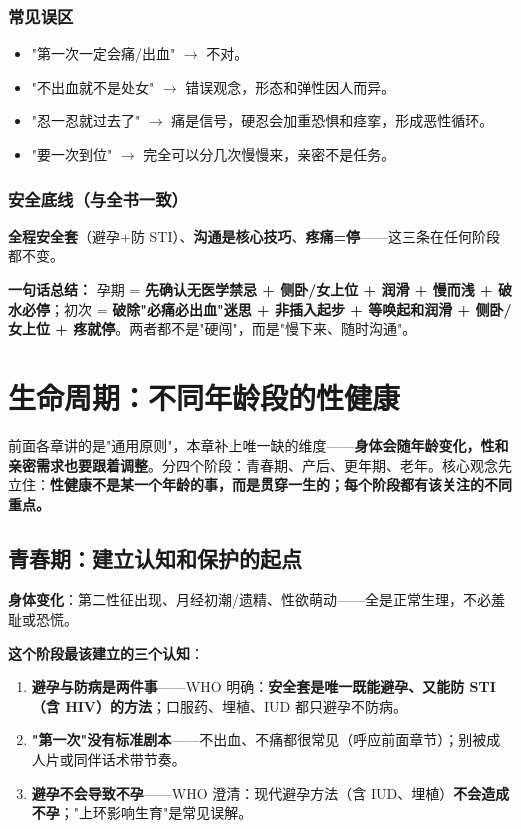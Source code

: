 \documentclass[12pt,UTF8,openany]{ctexbook}
\begin{document}
\subsection{常见误区}

\begin{itemize}[leftmargin=2em,itemsep=0.3em]
  \item "第一次一定会痛/出血" $\rightarrow$ 不对。
  \item "不出血就不是处女" $\rightarrow$ 错误观念，形态和弹性因人而异。
  \item "忍一忍就过去了" $\rightarrow$ 痛是信号，硬忍会加重恐惧和痉挛，形成恶性循环。
  \item "要一次到位" $\rightarrow$ 完全可以分几次慢慢来，亲密不是任务。
\end{itemize}

\subsection{安全底线（与全书一致）}

\textbf{全程安全套}（避孕+防 STI）、\textbf{沟通是核心技巧}、\textbf{疼痛=停}——这三条在任何阶段都不变。

\vspace{1em}
\noindent\textbf{一句话总结：} 孕期 = \textbf{先确认无医学禁忌 + 侧卧/女上位 + 润滑 + 慢而浅 + 破水必停}；初次 = \textbf{破除"必痛必出血"迷思 + 非插入起步 + 等唤起和润滑 + 侧卧/女上位 + 疼就停}。两者都不是"硬闯"，而是"慢下来、随时沟通"。

\chapter{生命周期：不同年龄段的性健康}

前面各章讲的是"通用原则"，本章补上唯一缺的维度——\textbf{身体会随年龄变化，性和亲密需求也要跟着调整}。分四个阶段：青春期、产后、更年期、老年。核心观念先立住：\textbf{性健康不是某一个年龄的事，而是贯穿一生的；每个阶段都有该关注的不同重点。}

\section{青春期：建立认知和保护的起点}

\textbf{身体变化}：第二性征出现、月经初潮/遗精、性欲萌动——全是正常生理，不必羞耻或恐慌。

\textbf{这个阶段最该建立的三个认知}：

\begin{enumerate}[leftmargin=2em,itemsep=0.3em]
  \item \textbf{避孕与防病是两件事}——WHO 明确：\textbf{安全套是唯一既能避孕、又能防 STI（含 HIV）的方法}；口服药、埋植、IUD 都只避孕不防病。
  \item \textbf{"第一次"没有标准剧本}——不出血、不痛都很常见（呼应前面章节）；别被成人片或同伴话术带节奏。
  \item \textbf{避孕不会导致不孕}——WHO 澄清：现代避孕方法（含 IUD、埋植）\textbf{不会造成不孕}；"上环影响生育"是常见误解。
\end{enumerate}
\end{document}
